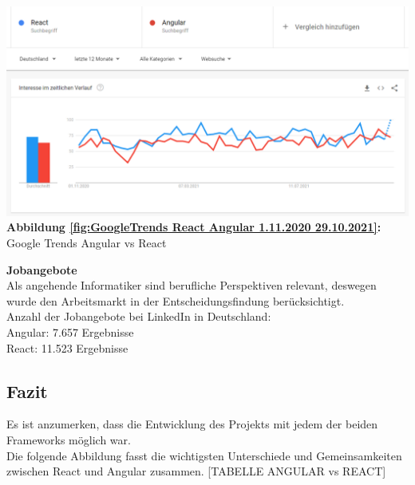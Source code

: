 \begin{center}
  \includegraphics[scale=0.5]
  {sources/GoogleTrends React Angular 1.11.2020 29.10.2021}\label{fig:GoogleTrends React Angular 1.11.2020 29.10.2021}\\
  \textbf{Abbildung \autoref{fig:GoogleTrends React Angular 1.11.2020 29.10.2021}:} Google Trends Angular vs React
    {\cite{GO01}}
\end{center}

\begin{flushleft}
\textbf{Jobangebote}\\
Als angehende Informatiker sind berufliche Perspektiven relevant, deswegen wurde den Arbeitsmarkt in der Entscheidungsfindung berücksichtigt.
\\
  Anzahl der Jobangebote bei LinkedIn in Deutschland:
  \\
  Angular: 7.657 Ergebnisse{\cite{LI1}}
  \\
  React: 11.523 Ergebnisse{\cite{LI2}}
\end{flushleft}

\subsection{Fazit}
Es ist anzumerken, dass die Entwicklung des Projekts mit jedem der beiden Frameworks möglich war.
\\
Die folgende Abbildung fasst die wichtigsten Unterschiede und Gemeinsamkeiten zwischen React und Angular zusammen.
[TABELLE ANGULAR vs REACT]

